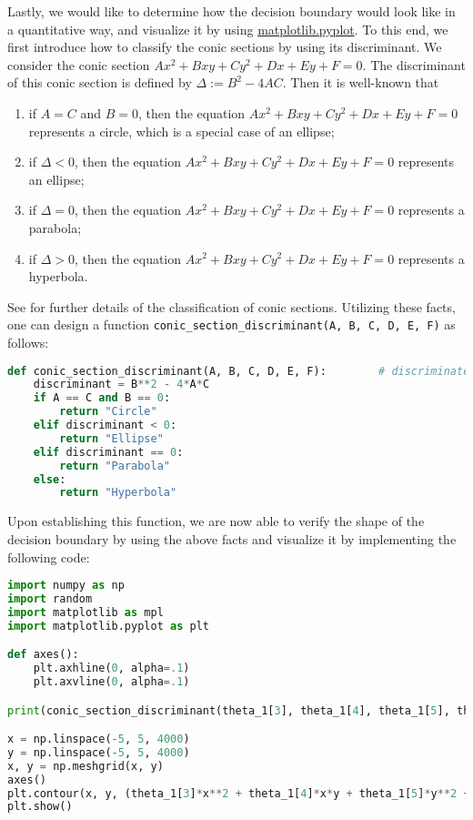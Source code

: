 \documentclass[11pt]{article}
\begin{document}
\indent Lastly, we would like to determine how the decision boundary would look like in a quantitative way, and visualize it by using \href{https://matplotlib.org/stable/api/_as_gen/matplotlib.pyplot.html}{matplotlib.pyplot}. To this end, we first introduce how to classify the conic sections by using its discriminant. We consider the conic section $A x^2 + B xy + C y^2 + Dx + Ey + F = 0$. The discriminant of this conic section is defined by $\Delta := B^2 - 4AC$. Then it is well-known that
\begin{enumerate}
    \item if $A = C$ and $B = 0$, then the equation $A x^2 + B xy + C y^2 + Dx + Ey + F = 0$ represents a circle, which is a special case of an ellipse;
    \item if $\Delta < 0$, then the equation $A x^2 + B xy + C y^2 + Dx + Ey + F = 0$ represents an ellipse;
    \item if $\Delta = 0$, then the equation $A x^2 + B xy + C y^2 + Dx + Ey + F = 0$ represents a parabola;
    \item if $\Delta > 0$, then the equation $A x^2 + B xy + C y^2 + Dx + Ey + F = 0$ represents a hyperbola.
\end{enumerate}
See \cite{protter1988calculus} for further details of the classification of conic sections. Utilizing these facts, one can design a function \texttt{conic\_section\_discriminant(A, B, C, D, E, F)} as follows:
\begin{lstlisting}[language = Python]
def conic_section_discriminant(A, B, C, D, E, F):        # discriminate the conic section Ax^2 + Bxy + Cy^2 + Dx + Ey + F = 0
    discriminant = B**2 - 4*A*C
    if A == C and B == 0:
        return "Circle"
    elif discriminant < 0:
        return "Ellipse"
    elif discriminant == 0:
        return "Parabola"
    else:
        return "Hyperbola"
\end{lstlisting}
Upon establishing this function, we are now able to verify the shape of the decision boundary by using the above facts and visualize it by implementing the following code:
\begin{lstlisting}[language = Python]
import numpy as np
import random
import matplotlib as mpl
import matplotlib.pyplot as plt

def axes():
    plt.axhline(0, alpha=.1)
    plt.axvline(0, alpha=.1)

print(conic_section_discriminant(theta_1[3], theta_1[4], theta_1[5], theta_1[1], theta_1[2], theta_1[0]))     # discriminate the conic section formed as the zero set of the optimal order-2 polynomial that minimizes (3) (= the decision boundary)

x = np.linspace(-5, 5, 4000)
y = np.linspace(-5, 5, 4000)
x, y = np.meshgrid(x, y)
axes()
plt.contour(x, y, (theta_1[3]*x**2 + theta_1[4]*x*y + theta_1[5]*y**2 + theta_1[1]*x + theta_1[2]*y + theta_1[0]), [0], colors='k')
plt.show()
\end{lstlisting}
\end{document}
